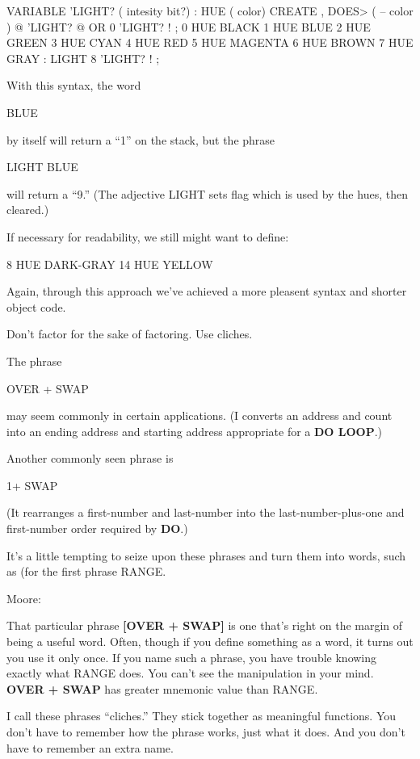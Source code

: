 \begin{Code}
VARIABLE 'LIGHT?  ( intesity bit?)
: HUE  ( color)  CREATE ,
   DOES>  ( -- color )  @  'LIGHT? @  OR  0 'LIGHT? ! ;
 0 HUE BLACK         1 HUE BLUE           2 HUE GREEN
 3 HUE CYAN          4 HUE RED            5 HUE MAGENTA
 6 HUE BROWN         7 HUE GRAY
: LIGHT   8 'LIGHT? ! ;
\end{Code}

\noindent     
With this syntax, the word

\begin{Code}
BLUE
\end{Code}
by itself will return a ``1'' on the stack, but the phrase

\begin{Code}
LIGHT BLUE
\end{Code}
will return a ``9.'' (The adjective LIGHT sets flag which is used by the hues, then cleared.)

If necessary for readability, we still might want to define:

\begin{Code}
8 HUE DARK-GRAY
14 HUE YELLOW
\end{Code}
Again, through this approach we've achieved a more pleasent syntax and shorter object code.

\begin{tip}
Don't factor for the sake of factoring. Use cliches.
\end{tip}
The phrase

\begin{Code}
OVER + SWAP
\end{Code}
may seem commonly in certain applications. (I converts an address and count into an ending address and starting address appropriate for a \textbf{DO LOOP}.)

Another commonly seen phrase is

\begin{Code}
1+ SWAP
\end{Code}
(It rearranges a first-number and last-number into the last-number-plus-one and first-number order required by \textbf{DO}.)

It's a little tempting to seize upon these phrases and turn them into words, such as (for the first phrase RANGE.

\bigskip
\blackline{2ex}
\noindent Moore:

\begin{tfquot}
That particular phrase \textbf{[OVER + SWAP]} is one that's right on the margin of being a useful word. Often, though if you define something as a word, it turns out you use it only once. If you name such a phrase, you have trouble knowing exactly what RANGE does. You can't see the manipulation in your mind. \textbf{OVER + SWAP} has greater mnemonic value than RANGE.
\end{tfquot}
\blackline{1ex}
I call these phrases ``cliches.'' They stick together as meaningful functions. You don't have to remember how the phrase works, just what it does. And you don't have to remember an extra name.

